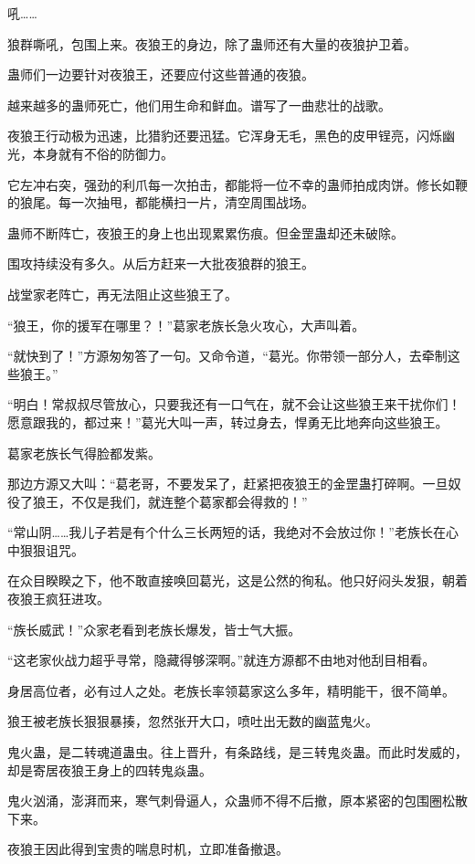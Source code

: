 \begin{this_body}
吼……

狼群嘶吼，包围上来。夜狼王的身边，除了蛊师还有大量的夜狼护卫着。

蛊师们一边要针对夜狼王，还要应付这些普通的夜狼。

越来越多的蛊师死亡，他们用生命和鲜血。谱写了一曲悲壮的战歌。

夜狼王行动极为迅速，比猎豹还要迅猛。它浑身无毛，黑色的皮甲锃亮，闪烁幽光，本身就有不俗的防御力。

它左冲右突，强劲的利爪每一次拍击，都能将一位不幸的蛊师拍成肉饼。修长如鞭的狼尾。每一次抽甩，都能横扫一片，清空周围战场。

蛊师不断阵亡，夜狼王的身上也出现累累伤痕。但金罡蛊却还未破除。

围攻持续没有多久。从后方赶来一大批夜狼群的狼王。

战堂家老阵亡，再无法阻止这些狼王了。

“狼王，你的援军在哪里？！”葛家老族长急火攻心，大声叫着。

“就快到了！”方源匆匆答了一句。又命令道，“葛光。你带领一部分人，去牵制这些狼王。”

“明白！常叔叔尽管放心，只要我还有一口气在，就不会让这些狼王来干扰你们！愿意跟我的，都过来！”葛光大叫一声，转过身去，悍勇无比地奔向这些狼王。

葛家老族长气得脸都发紫。

那边方源又大叫：“葛老哥，不要发呆了，赶紧把夜狼王的金罡蛊打碎啊。一旦奴役了狼王，不仅是我们，就连整个葛家都会得救的！”

“常山阴……我儿子若是有个什么三长两短的话，我绝对不会放过你！”老族长在心中狠狠诅咒。

在众目睽睽之下，他不敢直接唤回葛光，这是公然的徇私。他只好闷头发狠，朝着夜狼王疯狂进攻。

“族长威武！”众家老看到老族长爆发，皆士气大振。

“这老家伙战力超乎寻常，隐藏得够深啊。”就连方源都不由地对他刮目相看。

身居高位者，必有过人之处。老族长率领葛家这么多年，精明能干，很不简单。

狼王被老族长狠狠暴揍，忽然张开大口，喷吐出无数的幽蓝鬼火。

鬼火蛊，是二转魂道蛊虫。往上晋升，有条路线，是三转鬼炎蛊。而此时发威的，却是寄居夜狼王身上的四转鬼焱蛊。

鬼火汹涌，澎湃而来，寒气刺骨逼人，众蛊师不得不后撤，原本紧密的包围圈松散下来。

夜狼王因此得到宝贵的喘息时机，立即准备撤退。


\end{this_body}
